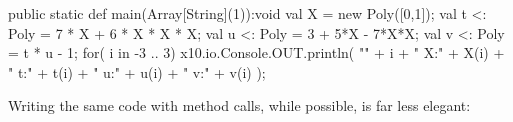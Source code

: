 %
%


\begin{xten}
  public static def main(Array[String](1)):void {
     val X = new Poly([0,1]);
     val t <: Poly = 7 * X + 6 * X * X * X; 
     val u <: Poly = 3 + 5*X - 7*X*X;
     val v <: Poly = t * u - 1;
     for( i in -3 .. 3) {
       x10.io.Console.OUT.println(
         "" + i + "	X:" + X(i) + "	t:" + t(i) 
         + "	u:" + u(i) + "	v:" + v(i)
         );
     }
  }

\end{xten}

Writing the same code with method calls, while possible, is far less elegant: 

